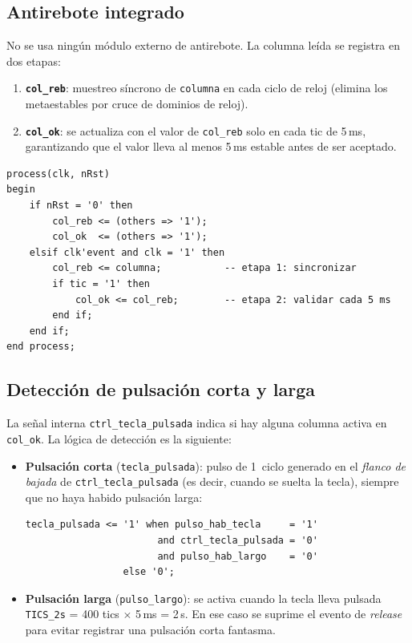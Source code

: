 \documentclass[memoria_final]{subfiles}
\begin{document}
\subsection{Antirebote integrado}

No se usa ningún módulo externo de antirebote. La columna leída se registra
en dos etapas:

\begin{enumerate}[leftmargin=1.8cm,itemsep=2pt]
  \item \textbf{\texttt{col\_reb}}: muestreo síncrono de \texttt{columna} en
    cada ciclo de reloj (elimina los metaestables por cruce de dominios de
    reloj).
  \item \textbf{\texttt{col\_ok}}: se actualiza con el valor de
    \texttt{col\_reb} solo en cada tic de 5\,ms, garantizando que el valor
    lleva al menos 5\,ms estable antes de ser aceptado.
\end{enumerate}

\begin{lstlisting}[caption={Antirebote de dos etapas en \texttt{ctrl\_tec.vhd}}]
process(clk, nRst)
begin
    if nRst = '0' then
        col_reb <= (others => '1');
        col_ok  <= (others => '1');
    elsif clk'event and clk = '1' then
        col_reb <= columna;           -- etapa 1: sincronizar
        if tic = '1' then
            col_ok <= col_reb;        -- etapa 2: validar cada 5 ms
        end if;
    end if;
end process;
\end{lstlisting}

\subsection{Detección de pulsación corta y larga}

La señal interna \texttt{ctrl\_tecla\_pulsada} indica si hay alguna columna
activa en \texttt{col\_ok}. La lógica de detección es la siguiente:

\begin{itemize}[leftmargin=1.6cm,itemsep=3pt]
  \item \textbf{Pulsación corta} (\texttt{tecla\_pulsada}): pulso de
    1~ciclo generado en el \textit{flanco de bajada} de
    \texttt{ctrl\_tecla\_pulsada} (es decir, cuando se suelta la tecla),
    siempre que no haya habido pulsación larga:
    \begin{lstlisting}[numbers=none,aboveskip=4pt,belowskip=4pt]
tecla_pulsada <= '1' when pulso_hab_tecla     = '1'
                       and ctrl_tecla_pulsada = '0'
                       and pulso_hab_largo    = '0'
                 else '0';
    \end{lstlisting}
  \item \textbf{Pulsación larga} (\texttt{pulso\_largo}): se activa cuando
    la tecla lleva pulsada \texttt{TICS\_2s} = 400 tics $\times$ 5\,ms
    = 2\,s. En ese caso se suprime el evento de \textit{release} para evitar
    registrar una pulsación corta fantasma.
\end{itemize}
\end{document}

